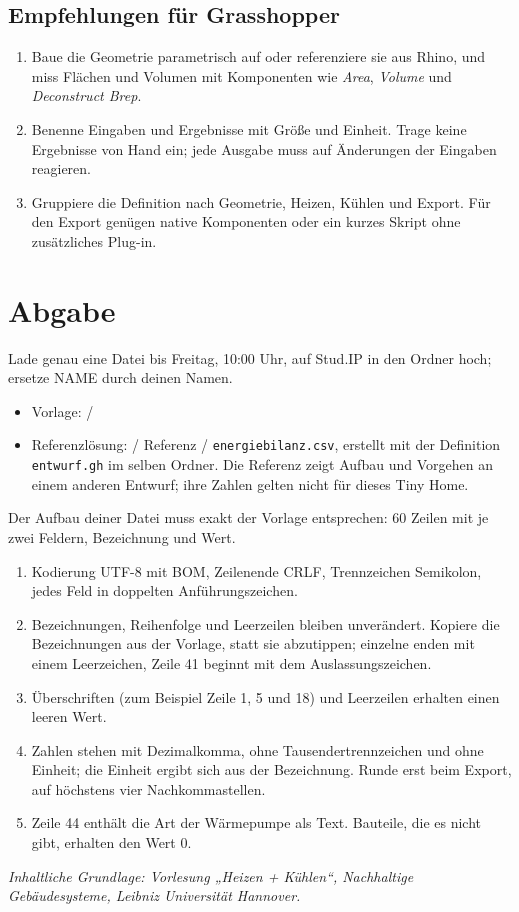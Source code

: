 \subsection{Empfehlungen für Grasshopper}
\begin{enumerate}
\item Baue die Geometrie parametrisch auf oder referenziere sie aus Rhino, und miss Flächen und Volumen mit Komponenten wie \emph{Area}, \emph{Volume} und \emph{Deconstruct Brep}.
\item Benenne Eingaben und Ergebnisse mit Größe und Einheit. Trage keine Ergebnisse von Hand ein; jede Ausgabe muss auf Änderungen der Eingaben reagieren.
\item Gruppiere die Definition nach Geometrie, Heizen, Kühlen und Export. Für den Export genügen native Komponenten oder ein kurzes Skript ohne zusätzliches Plug-in.
\end{enumerate}
\section{Abgabe}
Lade genau eine Datei \EnergySubmissionFile{} bis Freitag, 10:00 Uhr, auf Stud.IP in den Ordner \emph{\EnergyStudIpUpload} hoch; ersetze NAME durch deinen Namen.
\begin{itemize}
\item Vorlage: \EnergyStudIpFiles{} / \EnergyTemplateFile
\item Referenzlösung: \EnergyStudIpFiles{} / Referenz / \texttt{energiebilanz.csv}, erstellt mit der Definition \texttt{entwurf.gh} im selben Ordner. Die Referenz zeigt Aufbau und Vorgehen an einem anderen Entwurf; ihre Zahlen gelten nicht für dieses Tiny Home.
\end{itemize}
Der Aufbau deiner Datei muss exakt der Vorlage entsprechen: 60 Zeilen mit je zwei Feldern, Bezeichnung und Wert.
\begin{enumerate}
\item Kodierung UTF-8 mit BOM, Zeilenende CRLF, Trennzeichen Semikolon, jedes Feld in doppelten Anführungszeichen.
\item Bezeichnungen, Reihenfolge und Leerzeilen bleiben unverändert. Kopiere die Bezeichnungen aus der Vorlage, statt sie abzutippen; einzelne enden mit einem Leerzeichen, Zeile 41 beginnt mit dem Auslassungszeichen.
\item Überschriften (zum Beispiel Zeile 1, 5 und 18) und Leerzeilen erhalten einen leeren Wert.
\item Zahlen stehen mit Dezimalkomma, ohne Tausendertrennzeichen und ohne Einheit; die Einheit ergibt sich aus der Bezeichnung. Runde erst beim Export, auf höchstens vier Nachkommastellen.
\item Zeile 44 enthält die Art der Wärmepumpe als Text. Bauteile, die es nicht gibt, erhalten den Wert 0.
\end{enumerate}
\EnergyCsvTemplate

\small\textit{Inhaltliche Grundlage: Vorlesung „Heizen + Kühlen“, Nachhaltige Gebäudesysteme, Leibniz Universität Hannover.}

